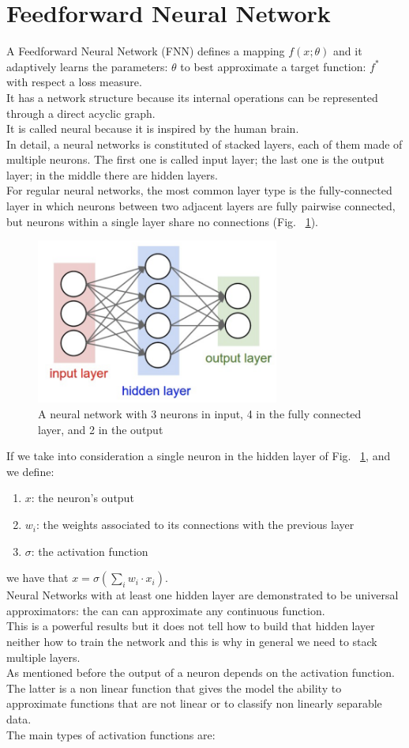 \documentclass[LaM,binding=0.6cm]{sapthesis}
\begin{document}
\section{Feedforward Neural Network}
A Feedforward Neural Network (FNN) defines a mapping $f(x;\theta)$ and it adaptively learns the parameters: $\theta$ to best approximate a target function: $f^{*}$ with respect a loss measure.\\It has a network structure because its internal operations can be represented through a direct acyclic graph.\\It is called neural because it is inspired by the human brain.\\In detail, a neural networks is constituted of stacked layers, each of them made of multiple neurons. The first one is called input layer; the last one is the output layer; in the middle there are hidden layers.\\ For regular neural networks, the most common layer type is the fully-connected layer in which neurons between two adjacent layers are fully pairwise connected, but neurons within a single layer share no connections (Fig. ~\ref{fig:fnnex}).
\begin{figure}[H]  \centering
    \includegraphics[width=80mm,scale=0.7]{fnnex}
    \caption{A neural network with 3 neurons in input, 4 in the fully connected layer, and 2 in the output \cite{cnnsite} }
    \label{fig:fnnex}
\end{figure}
If we take into consideration a single neuron in the hidden layer of Fig. ~\ref{fig:fnnex}, and we define:
\begin{enumerate}
\item $x$: the neuron's output 
\item $w_i$: the weights associated to its connections with the previous layer
\item $\sigma$: the activation function
\end{enumerate}
we have that $x=\sigma(\sum_i w_i\cdot x_i)$.\\Neural Networks with at least one hidden layer are demonstrated to be universal approximators: the can can approximate any continuous function.\\This is a powerful results but it does not tell how to build that hidden layer neither how to train the network and this is why in general we need to stack multiple layers.\\As mentioned before the output of a neuron depends on the activation function. The latter is a non linear function that gives the model the ability to approximate functions that are not linear or to classify non linearly separable data.\\The main types of activation functions are:
\end{document}
